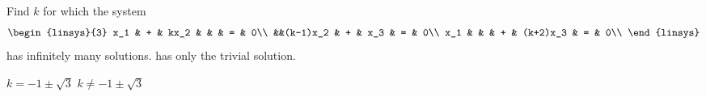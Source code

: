 
\begin{Exercise}[name={},
title={}, 
origin={\cite{OV}},
counter=Exercise]
Find $k$ for which the system
\[
\begin{linsys}{3}
x_1 & + & kx_2 & & & = & 0\\
&&(k-1)x_2 & + & x_3 & = & 0\\
x_1 &  & & + & (k+2)x_3 & = & 0\\
\end{linsys}
\]
\Question has infinitely many solutions.
\Question has only the trivial solution.
\end{Exercise}

\begin{Answer}
\Question $k=-1\pm\sqrt{3}$
\Question $k\neq-1\pm\sqrt{3}$
\end{Answer}

